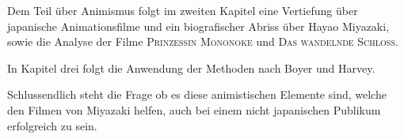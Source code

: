 Dem Teil über Animismus folgt im zweiten Kapitel eine Vertiefung über japanische Animationsfilme und ein biografischer Abriss über Hayao Miyazaki, sowie die Analyse der Filme \textsc{Prinzessin Mononoke} und \textsc{Das wandelnde Schloss}. 

In Kapitel drei folgt die Anwendung der Methoden nach Boyer und Harvey. 

Schlussendlich steht die Frage ob es diese animistischen Elemente sind, welche den Filmen von Miyazaki helfen, auch bei einem nicht japanischen Publikum erfolgreich zu sein.